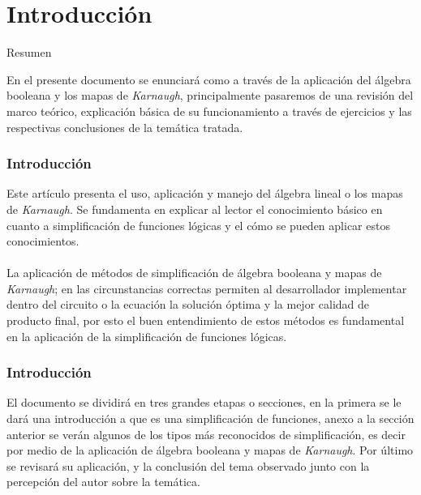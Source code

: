 \documentclass[aspectratio=169]{beamer}
\begin{document}
\section{Introducción} 

\begin{frame}{Resumen}

En el presente documento se enunciará como a través de la aplicación del álgebra booleana y los mapas de \textit{Karnaugh}, principalmente pasaremos de una revisión del marco teórico, explicación básica de su funcionamiento a través de ejercicios y las respectivas conclusiones de la temática tratada.

\end{frame}


\begin{frame}
\frametitle{Introducción}

E{\MakeLowercase{ste}} artículo presenta el uso, aplicación y manejo del álgebra lineal o los mapas de \textit{Karnaugh}. Se fundamenta en explicar al lector el conocimiento básico en cuanto a simplificación de funciones lógicas y el cómo se pueden aplicar estos conocimientos.\\
\hspace{2px} \\
La \alert{aplicación de métodos de simplificación de álgebra booleana y mapas de \textit{Karnaugh}}; en las circunstancias correctas permiten al desarrollador implementar dentro del circuito o la ecuación la solución óptima y la mejor calidad de  producto final, por esto el buen entendimiento de estos métodos es fundamental en la aplicación de la simplificación de funciones lógicas.\\

\end{frame}

\begin{frame}
\frametitle{Introducción}

El documento se dividirá en \alert{tres grandes etapas o secciones, en la primera} se le dará una introducción a que es una simplificación de funciones, \alert{anexo a la sección anterior} se verán algunos de los tipos más reconocidos de simplificación, es decir por medio de la aplicación de álgebra booleana y mapas de \textit{Karnaugh}. \alert{Por último} se revisará su aplicación, y la conclusión del tema observado junto con la percepción del autor sobre la temática.

\end{frame}
\end{document}
